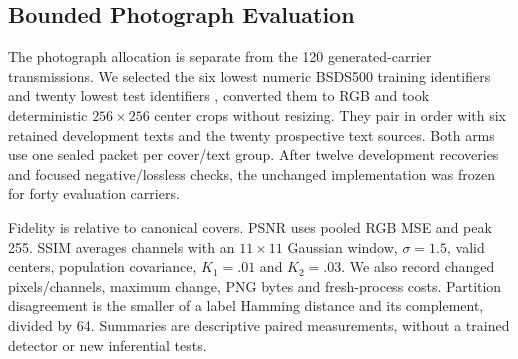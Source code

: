 \subsection{Bounded Photograph Evaluation}
The photograph allocation is separate from the 120 generated-carrier transmissions. We selected the six lowest numeric BSDS500 training identifiers and twenty lowest test identifiers \cite{bsds}, converted them to RGB and took deterministic $256\times256$ center crops without resizing. They pair in order with six retained development texts and the twenty prospective text sources. Both arms use one sealed packet per cover/text group. After twelve development recoveries and focused negative/lossless checks, the unchanged implementation was frozen for forty evaluation carriers.

Fidelity is relative to canonical covers. PSNR uses pooled RGB MSE and peak 255. SSIM averages channels with an $11\times11$ Gaussian window, $\sigma=1.5$, valid centers, population covariance, $K_1=.01$ and $K_2=.03$. We also record changed pixels/channels, maximum change, PNG bytes and fresh-process costs. Partition disagreement is the smaller of a label Hamming distance and its complement, divided by 64. Summaries are descriptive paired measurements, without a trained detector or new inferential tests.
